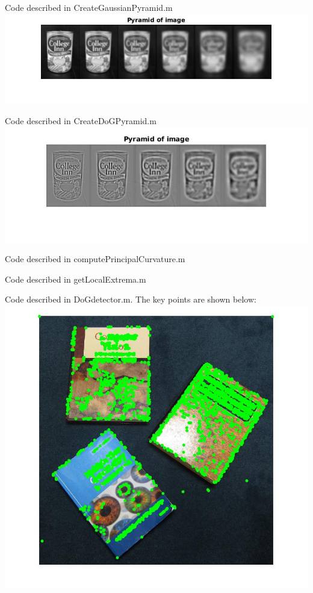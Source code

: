 \documentclass[12pt]{article}
\newenvironment{problem}[2][Problem]{\begin{trivlist}
\item[\hskip \labelsep {\bfseries #1}\hskip \labelsep {\bfseries #2.}]}{\end{trivlist}}
\begin{document}
\begin{problem}{1.1}
Code described in CreateGaussianPyramid.m\\
\includegraphics[scale = 0.4]{results/Gaupyr} 
\end{problem}
\begin{problem}{1.2}
Code described in CreateDoGPyramid.m \\
\includegraphics[scale = 0.4]{results/DoGpyr} 
\end{problem}
\begin{problem}{1.3}
Code described in computePrincipalCurvature.m 
\end{problem}
\begin{problem}{1.4}
Code described in getLocalExtrema.m 
\end{problem}
\newpage
\begin{problem}{1.5}
Code described in DoGdetector.m. The key points are shown below:\\
\includegraphics[scale = 0.3]{results/breifPoints1} 
\end{problem}
\end{document}
